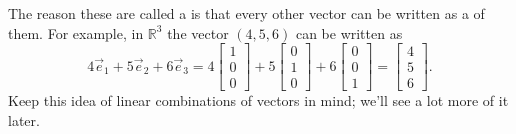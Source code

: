 \documentclass{ximera}
\begin{document}
The reason these are called a \emph{} is that every other vector can be written as a \emph{} of them. For example, in ${\mathbb R}^3$ the vector $(4,5,6)$ can be written as
\begin{equation*}
    4 \vec{e}_1 + 5 \vec{e}_2 + 6 \vec{e}_3 = 4
    \begin{bmatrix}
        1 \\ 0 \\ 0
    \end{bmatrix}
    + 5
    \begin{bmatrix}
        0 \\ 1 \\ 0
    \end{bmatrix}
    + 6
    \begin{bmatrix}
        0 \\ 0 \\ 1
    \end{bmatrix}
    =
    \begin{bmatrix}
        4 \\ 5 \\ 6
    \end{bmatrix} .
\end{equation*}
Keep this idea of linear combinations of vectors in mind; we'll see a lot more of it later.
\end{document}
